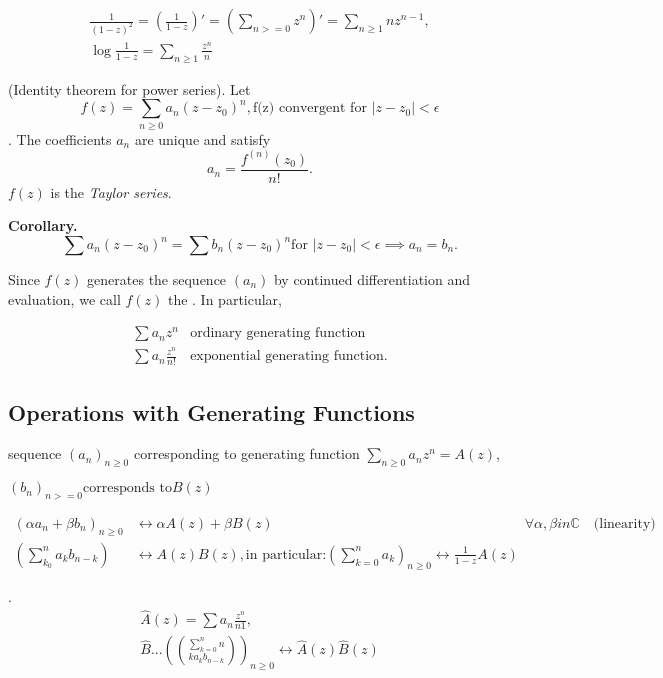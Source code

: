 \begin{gather*}
    \frac1{(1-z)^2}
    = (\frac1{1-z})'
    = (\sum_{n>=0} z^n)'
    = \sum_{n≥1} n z^{n-1}, \\
    
    \log\frac{1}{1-z} = \sum_{n≥1} \frac{z^n}{n}
\end{gather*}

\Theorem (Identity theorem for power series).
Let
\[
    f(z) = \sum_{n≥0} a_n (z-z_0)^n,
    \text{f(z) convergent for $|z-z_0| < \epsilon$}
\].
The coefficients $a_n$ are unique and satisfy
\[
    a_n = \frac{f^{(n)}(z_0)}{n!}.
\]
$f(z)$ is the \emph{Taylor series}.

\textbf{Corollary.}
\[
    \sum a_n (z-z_0)^n =
    \sum b_n (z-z_0)^n
    \text{for $|z-z_0| < \epsilon$}
    \implies
    a_n = b_n.
\]

Since $f(z)$ generates the sequence $(a_n)$ by continued differentiation and evaluation, we call $f(z)$ the . In particular,

\begin{align*}
\sum a_n z^n & \text{ordinary generating function} \\
\sum a_n \frac{z^n}{n!} & \text{exponential generating function.}
\end{align*}


\subsection*{Operations with Generating Functions}

sequence $(a_n)_{n≥0}$ corresponding to generating function
$\sum_{n≥0} a_n z^n = A(z)$,

$(b_n)_{n>=0} \text{corresponds to} B(z)$

\begin{align*}
    (\alpha a_n + \beta b_n)_{n≥0}
        &↔ \alpha A(z) + \beta B(z)
        &&\forall \alpha, \beta in \mathbb{C}
        \quad\text{(linearity)} \\
    (\sum_{k_0}^{n} a_k b_{n-k} )
        &↔ A(z) B(z),
        \text{in particular:}
        (\sum_{k=0}^n a_k)_{n≥0} ↔ \frac{1}{1-z} A(z)
\end{align*}

\Remark.
\begin{align*}
    \hat{A}(z) = \sum a_n \frac{z^n}{n1}, \\
    \hat{B}...
    
    (\sum_{k=0}^n n\choose k a_k b_{n-k})_{n≥0}
        ↔ \hat A(z)\hat B(z)
\end{align*}

